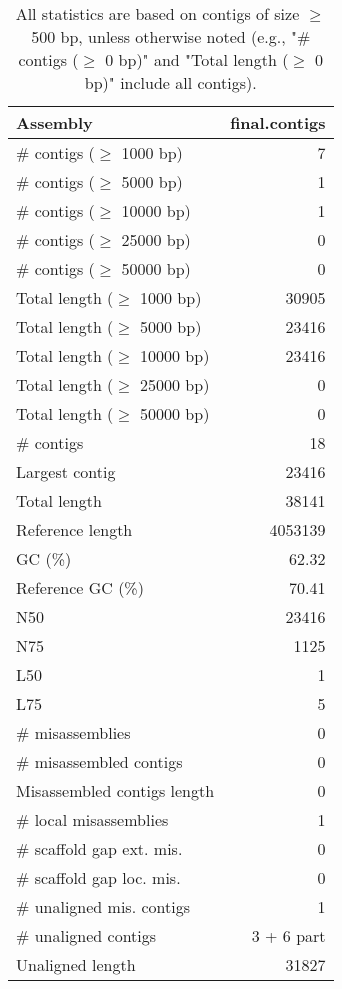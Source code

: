 \documentclass[12pt,a4paper]{article}
\begin{document}
\begin{table}[ht]
\begin{center}
\caption{All statistics are based on contigs of size $\geq$ 500 bp, unless otherwise noted (e.g., "\# contigs ($\geq$ 0 bp)" and "Total length ($\geq$ 0 bp)" include all contigs).}
\begin{tabular}{|l*{1}{|r}|}
\hline
Assembly & final.contigs \\ \hline
\# contigs ($\geq$ 1000 bp) & 7 \\ \hline
\# contigs ($\geq$ 5000 bp) & 1 \\ \hline
\# contigs ($\geq$ 10000 bp) & 1 \\ \hline
\# contigs ($\geq$ 25000 bp) & 0 \\ \hline
\# contigs ($\geq$ 50000 bp) & 0 \\ \hline
Total length ($\geq$ 1000 bp) & 30905 \\ \hline
Total length ($\geq$ 5000 bp) & 23416 \\ \hline
Total length ($\geq$ 10000 bp) & 23416 \\ \hline
Total length ($\geq$ 25000 bp) & 0 \\ \hline
Total length ($\geq$ 50000 bp) & 0 \\ \hline
\# contigs & 18 \\ \hline
Largest contig & 23416 \\ \hline
Total length & 38141 \\ \hline
Reference length & 4053139 \\ \hline
GC (\%) & 62.32 \\ \hline
Reference GC (\%) & 70.41 \\ \hline
N50 & 23416 \\ \hline
N75 & 1125 \\ \hline
L50 & 1 \\ \hline
L75 & 5 \\ \hline
\# misassemblies & 0 \\ \hline
\# misassembled contigs & 0 \\ \hline
Misassembled contigs length & 0 \\ \hline
\# local misassemblies & 1 \\ \hline
\# scaffold gap ext. mis. & 0 \\ \hline
\# scaffold gap loc. mis. & 0 \\ \hline
\# unaligned mis. contigs & 1 \\ \hline
\# unaligned contigs & 3 + 6 part \\ \hline
Unaligned length & 31827 \\ \hline

\end{tabular}
\end{center}
\end{table}
\end{document}
